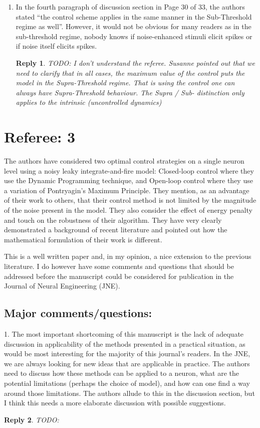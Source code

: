 \documentclass{article}
\newtheorem*{rep}{Reply}
\begin{document}
\begin{enumerate}
\item In the fourth paragraph of discussion section in Page 30 of 33, the
authors stated “the control scheme applies in the same manner in the Sub-Threshold
regime as well”. However, it would not be obvious for many readers as in the
sub-threshold regime, nobody knows if noise-enhanced stimuli elicit spikes or if
noise itself elicits spikes.
\begin{rep}
TODO: I don't understand the referee. Susanne pointed out that we need to
clarify that in all cases, the maximum value of the control puts the model in
the Supra-Threshold regime. That is using the control one can always have
Supra-Threshold behaviour. The Supra / Sub- distinction only applies to the
intrinsic (uncontrolled dynamics)
\end{rep}

\end{enumerate}

\clearpage
\section{Referee: 3}
The authors have considered two optimal control strategies on a single neuron
level using a noisy leaky integrate-and-fire model: Closed-loop control where
they use the Dynamic Programming technique, and Open-loop control where they use
a variation of Pontryagin's  Maximum Principle. They mention, as an advantage of
their work to others, that their control method is not limited by the magnitude
of the noise present in the model. They also consider the effect of energy
penalty and touch on the robustness of their algorithm. They have very clearly
demonstrated a background of recent literature and pointed out how the
mathematical formulation of their work is different.


This is a well written paper and, in my opinion, a nice extension to the
previous literature. I do however have some comments and questions that should
be addressed before the manuscript could be considered for publication in the
Journal of Neural Engineering (JNE).


\subsection{Major comments/questions:}
1. The most important shortcoming of this manuscript is the lack of adequate
discussion in applicability of the methods presented in a practical situation,
as would be most interesting for the majority of this journal's readers. In the
JNE, we are always looking for new ideas that are applicable in practice. The
authors need to discuss how these methods can be applied to a neuron, what are
the potential limitations (perhaps the choice of model), and how can one find a
way around those limitations. The authors allude to this in the discussion
section, but I think this needs a more elaborate discussion with possible
suggestions.
\begin{rep}
TODO:
\end{rep}
\end{document}
